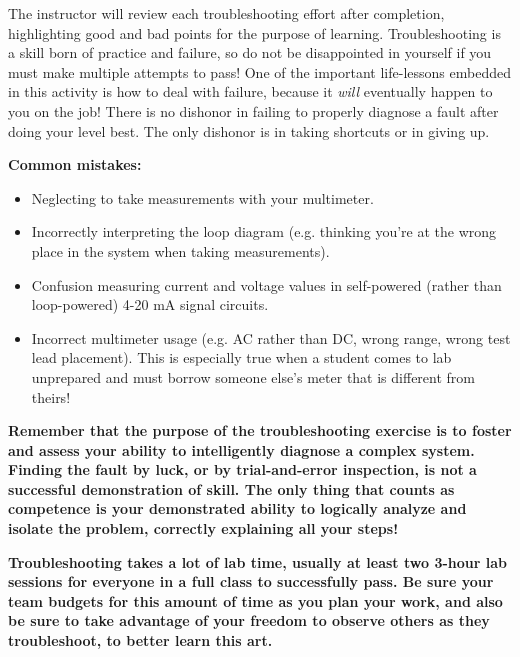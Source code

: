\documentclass[12pt,a4paper]{article}
\begin{document}
The instructor will review each troubleshooting effort after completion, highlighting good and bad points for the purpose of learning.  Troubleshooting is a skill born of practice and failure, so do not be disappointed in yourself if you must make multiple attempts to pass!  One of the important life-lessons embedded in this activity is how to deal with failure, because it {\it will} eventually happen to you on the job!  There is no dishonor in failing to properly diagnose a fault after doing your level best.  The only dishonor is in taking shortcuts or in giving up.

\vskip 10pt

{\bf Common mistakes:}

\begin{itemize}
\item{} Neglecting to take measurements with your multimeter.
\item{} Incorrectly interpreting the loop diagram (e.g. thinking you're at the wrong place in the system when taking measurements).
\item{} Confusion measuring current and voltage values in self-powered (rather than loop-powered) 4-20 mA signal circuits.
\item{} Incorrect multimeter usage (e.g. AC rather than DC, wrong range, wrong test lead placement).  This is especially true when a student comes to lab unprepared and must borrow someone else's meter that is different from theirs!
\end{itemize}

\vskip 10pt

{\bf Remember that the purpose of the troubleshooting exercise is to foster and assess your ability to intelligently diagnose a complex system.  Finding the fault by luck, or by trial-and-error inspection, is not a successful demonstration of skill.  The only thing that counts as competence is your demonstrated ability to logically analyze and isolate the problem, correctly explaining all your steps!}

\vskip 10pt

{\bf Troubleshooting takes a lot of lab time, usually at least two 3-hour lab sessions for everyone in a full class to successfully pass.  Be sure your team budgets for this amount of time as you plan your work, and also be sure to take advantage of your freedom to observe others as they troubleshoot, to better learn this art.}



\vfil \eject
\end{document}
